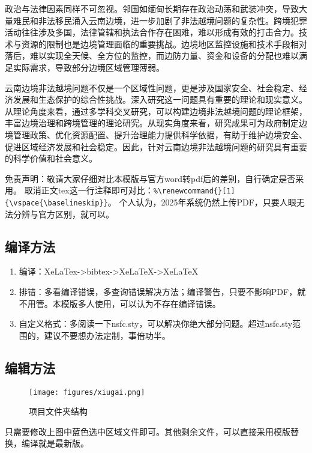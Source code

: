 政治与法律因素同样不可忽视。邻国如缅甸长期存在政治动荡和武装冲突，导致大量难民和非法移民涌入云南边境，进一步加剧了非法越境问题的复杂性。跨境犯罪活动往往涉及多国，法律管辖和执法合作存在困难，难以形成有效的打击合力。技术与资源的限制也是边境管理面临的重要挑战。边境地区监控设施和技术手段相对落后，难以实现全天候、全方位的监控，而边防力量、资金和设备的分配也难以满足实际需求，导致部分边境区域管理薄弱。

云南边境非法越境问题不仅是一个区域性问题，更是涉及国家安全、社会稳定、经济发展和生态保护的综合性挑战。深入研究这一问题具有重要的理论和现实意义。从理论角度来看，通过多学科交叉研究，可以构建边境非法越境问题的理论框架，丰富边境治理和跨境管理的理论研究。从现实角度来看，研究成果可为政府制定边境管理政策、优化资源配置、提升治理能力提供科学依据，有助于维护边境安全、促进区域经济发展和社会稳定。因此，针对云南边境非法越境问题的研究具有重要的科学价值和社会意义。













免责声明：敬请大家仔细对比本模版与官方word转pdf后的差别，自行确定是否采用。
取消正文tex这一行注释即可对比：\verb|%\renewcommand{}[1]|\\
\verb|{\vspace{\baselineskip}}|。
个人认为，2025年系统仍然上传PDF，只要人眼无法分辨与官方区别，就可以。

\subsection{编译方法}
\begin{enumerate}
	\item 编译：XeLaTex->bibtex->XeLaTeX->XeLaTeX
	\item 排错：多看编译错误，多查询错误解决方法；编译警告，只要不影响PDF，就不用管。本模版多人使用，可以认为不存在编译错误。
	\item 自定义格式：多阅读一下nsfc.sty，可以解决你绝大部分问题。超过nsfc.sty范围的，建议不要想办法定制，事倍功半。
\end{enumerate}


\subsection{编辑方法}
\vspace{-5pt}

\begin{figure}[h!]
	\centering %
	\texttt{[image: figures/xiugai.png]}
	\captionsetup{justification=centering} %
	\caption{项目文件夹结构}
\end{figure}
只需要修改上图中蓝色选中区域文件即可。其他剩余文件，可以直接采用模版替换，编译就是最新版。

